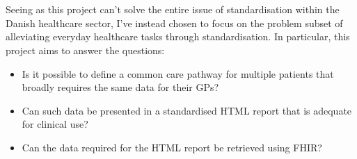 \\
\\
Seeing as this project can't solve the entire issue of standardisation within the Danish healthcare sector, I've instead chosen to focus on the problem subset of alleviating everyday healthcare tasks through standardisation. In particular, this project aims to answer the questions:
\begin{itemize}
    \item Is it possible to define a common care pathway for multiple patients that broadly requires the same data for their GPs?
    \item Can such data be presented in a standardised HTML report that is adequate for clinical use?
    \item Can the data required for the HTML report be retrieved using FHIR?
\end{itemize}   
